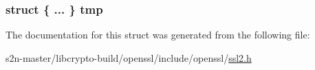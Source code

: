 \subsubsection[{\texorpdfstring{tmp}{tmp}}]{\setlength{\rightskip}{0pt plus 5cm}struct \{ ... \}   tmp}\hypertarget{structssl2__state__st_a0d3df667485ab6cea92e48c5f0f17d86}{}\label{structssl2__state__st_a0d3df667485ab6cea92e48c5f0f17d86}


The documentation for this struct was generated from the following file\+:\begin{DoxyCompactItemize}
\item 
s2n-\/master/libcrypto-\/build/openssl/include/openssl/\hyperlink{include_2openssl_2ssl2_8h}{ssl2.\+h}\end{DoxyCompactItemize}
